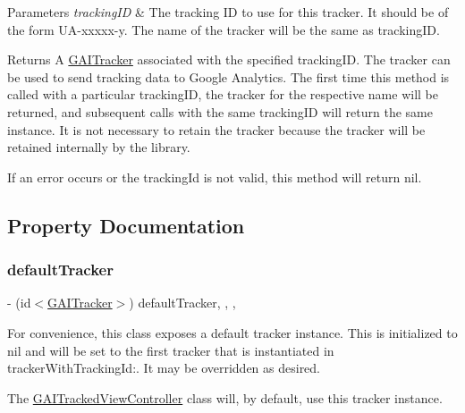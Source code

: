 \begin{DoxyParams}{Parameters}
{\em tracking\+ID} & The tracking ID to use for this tracker. It should be of the form {\ttfamily U\+A-\/xxxxx-\/y}. The name of the tracker will be the same as tracking\+ID.\\
\hline
\end{DoxyParams}
\begin{DoxyReturn}{Returns}
A \hyperlink{protocol_g_a_i_tracker-p}{G\+A\+I\+Tracker} associated with the specified tracking\+ID. The tracker can be used to send tracking data to Google Analytics. The first time this method is called with a particular tracking\+ID, the tracker for the respective name will be returned, and subsequent calls with the same tracking\+ID will return the same instance. It is not necessary to retain the tracker because the tracker will be retained internally by the library.
\end{DoxyReturn}
If an error occurs or the tracking\+Id is not valid, this method will return {\ttfamily nil}. 

\subsection{Property Documentation}
\mbox{\label{interface_g_a_i_a72941e445c4e4ec9b8c13b7f1cf73977}} 
\subsubsection{\texorpdfstring{default\+Tracker}{defaultTracker}}
{\footnotesize\ttfamily -\/ (id$<$\hyperlink{protocol_g_a_i_tracker-p}{G\+A\+I\+Tracker}$>$) default\+Tracker\hspace{0.3cm}{\ttfamily [read]}, {\ttfamily [write]}, {\ttfamily [nonatomic]}, {\ttfamily [assign]}}

For convenience, this class exposes a default tracker instance. This is initialized to {\ttfamily nil} and will be set to the first tracker that is instantiated in tracker\+With\+Tracking\+Id\+:. It may be overridden as desired.

The \hyperlink{interface_g_a_i_tracked_view_controller}{G\+A\+I\+Tracked\+View\+Controller} class will, by default, use this tracker instance. \mbox{\label{interface_g_a_i_a6756ef050da75f9d4239831fa2a1fed2}} 
